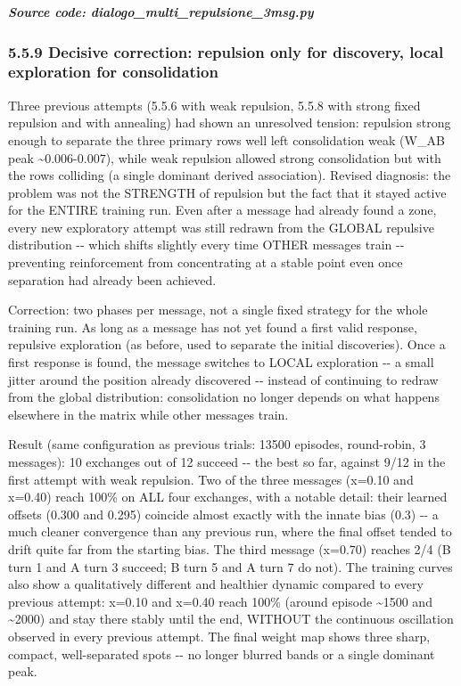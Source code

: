 \documentclass[
  english,
]{article}
\begin{document}
\textit{\textbf{Source code: dialogo\_\allowbreak{}multi\_\allowbreak{}repulsione\_\allowbreak{}3msg.py}}


\subsubsection{5.5.9 Decisive correction: repulsion only for discovery, local exploration for consolidation}\label{decisive-correction-repulsion-only-for-discovery-local-exploration-for-consolidation}

Three previous attempts (5.5.6 with weak repulsion, 5.5.8 with strong fixed repulsion and with annealing) had shown an unresolved tension: repulsion strong enough to separate the three primary rows well left consolidation weak (W\_\allowbreak{}AB peak \textasciitilde0.006-0.007), while weak repulsion allowed strong consolidation but with the rows colliding (a single dominant derived association). Revised diagnosis: the problem was not the STRENGTH of repulsion but the fact that it stayed active for the ENTIRE training run. Even after a message had already found a zone, every new exploratory attempt was still redrawn from the GLOBAL repulsive distribution -\/- which shifts slightly every time OTHER messages train -\/- preventing reinforcement from concentrating at a stable point even once separation had already been achieved.

Correction: two phases per message, not a single fixed strategy for the whole training run. As long as a message has not yet found a first valid response, repulsive exploration (as before, used to separate the initial discoveries). Once a first response is found, the message switches to LOCAL exploration -\/- a small jitter around the position already discovered -\/- instead of continuing to redraw from the global distribution: consolidation no longer depends on what happens elsewhere in the matrix while other messages train.

Result (same configuration as previous trials: 13500 episodes, round-robin, 3 messages): 10 exchanges out of 12 succeed -\/- the best so far, against 9/12 in the first attempt with weak repulsion. Two of the three messages (x=0.10 and x=0.40) reach 100\% on ALL four exchanges, with a notable detail: their learned offsets (0.300 and 0.295) coincide almost exactly with the innate bias (0.3) -\/- a much cleaner convergence than any previous run, where the final offset tended to drift quite far from the starting bias. The third message (x=0.70) reaches 2/4 (B turn 1 and A turn 3 succeed; B turn 5 and A turn 7 do not). The training curves also show a qualitatively different and healthier dynamic compared to every previous attempt: x=0.10 and x=0.40 reach 100\% (around episode \textasciitilde1500 and \textasciitilde2000) and stay there stably until the end, WITHOUT the continuous oscillation observed in every previous attempt. The final weight map shows three sharp, compact, well-separated spots -\/- no longer blurred bands or a single dominant peak.
\end{document}
